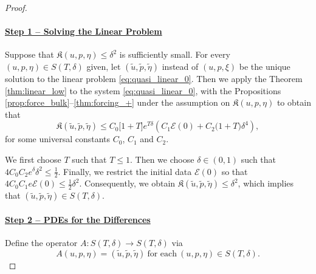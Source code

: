 \documentclass[letterpaper,reqno,10pt,twoside]{amsart}
\theoremstyle{definition}
\theoremstyle{remark}
\begin{document}
		\begin{proof}
			\
			\paragraph{\underline{Step 1 -- Solving the Linear Problem}}
			Suppose that $\mathfrak{K}(u,p,\eta)\le\delta^2$ is sufficiently small. For every $(u,p,\eta)\in S(T, \delta)$ given, let $(\tilde{u},\tilde{p},\tilde{\eta})$ instead of $(u, p, \xi)$ be the unique solution to the linear problem \eqref{eq:quasi_linear_0}.
			Then we apply the Theorem \ref{thm:linear_low} to the system \eqref{eq:quasi_linear_0}, with the Propositions \ref{prop:force_bulk}--\ref{thm:forcing_+} under the assumption on $\mathfrak{K}(u,p,\eta)$ to obtain that
			\[
			\mathfrak{K}(\tilde{u}, \tilde{p}, \tilde{\eta})\le C_0\Big[1+T\Big]e^{T\delta}\left(C_1\mathcal{E}(0)+C_2\Big(1+{T}\Big)\delta^4\right),
			\]
			for some universal constants $C_0$, $C_1$ and $C_2$. 
			
			We first choose $T$ such that $T\le 1$. Then we choose $\delta\in (0, 1)$ such that $4C_0C_2e^{\delta}\delta^2\le\frac12$. Finally, we restrict the initial data $\mathcal{E}(0)$ so that $4C_0C_1e\mathcal{E}(0)\le\frac12\delta^2$. Consequently, we obtain $\mathfrak{K}(\tilde{u}, \tilde{p}, \tilde{\eta})\le\delta^2$, which implies that $(\tilde{u}, \tilde{p}, \tilde{\eta})\in S(T, \delta)$.
			
			\paragraph{\underline{Step 2 -- PDEs for the Differences}}
			Define the operator $A:S(T, \delta)\rightarrow S(T, \delta)$ via
			\begin{equation}\label{def:map_a}
				A(u,p,\eta)=(\tilde{u},\tilde{p}, \tilde{\eta}) \ \text{for each}\ (u,p,\eta)\in S(T, \delta).
			\end{equation}
			

\end{proof}
\end{document}
